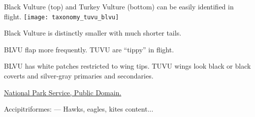 \documentclass[t]{beamer}
\begin{document}
\begin{frame}{Black Vulture (top) and Turkey Vulture (bottom) can be easily identified in flight.}
\texttt{[image: taxonomy\_tuvu\_blvu]}

Black Vulture is distinctly smaller with much shorter tails. 

\vspace{0.5\baselineskip}

BLVU flap more frequently. TUVU are “tippy” in flight.
\vspace{0.5\baselineskip}

BLVU has white patches restricted to wing tips. TUVU wings look black or black coverts and silver-gray primaries and secondaries.

\tinyfill \href{https://www.nps.gov/articles/netn-species-spotlight-vultures.htm}{National Park Service, Public Domain.}
\end{frame}

\begin{frame}{Accipitriformes:  — Hawks, eagles, kites}
content...
\end{frame}
\end{document}
